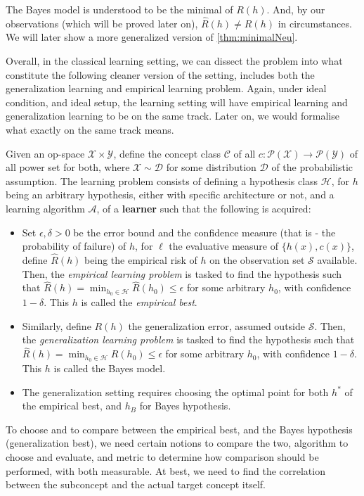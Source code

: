 The Bayes model is understood to be the minimal of $R(h)$. And, by our observations (which will be proved later on), $\hat{R}(h)\neq R(h)$ in circumstances. We will later show a more generalized version of \ref{thm:minimalNeu}. 

Overall, in the classical learning setting, we can dissect the problem into what constitute the following cleaner version of the setting, includes both the generalization learning and empirical learning problem. Again, under ideal condition, and ideal setup, the learning setting will have empirical learning and generalization learning to be on the same track. Later on, we would formalise what exactly on the same track means. 

\begin{setting}
    Given an op-space $\mathcal{X}\times\mathcal{Y}$, define the concept class $\mathcal{C}$ of all $c: \mathcal{P}(\mathcal{X})\to \mathcal{P}(\mathcal{Y})$ of all power set for both, where $\mathcal{X}\sim \mathcal{D}$ for some distribution $\mathcal{D}$ of the probabilistic assumption. The learning problem consists of defining a hypothesis class $\mathcal{H}$, for $h$ being an arbitrary hypothesis, either with specific architecture or not, and a learning algorithm $\mathcal{A}$, of a \textbf{learner} such that the following is acquired: 
    \begin{itemize}
        \item Set $\epsilon,\delta> 0$ be the error bound and the confidence measure (that is - the probability of failure) of $h$, for $\ell$ the evaluative measure of $\{h(x),c(x)\}$, define $\hat{R}(h)$ being the empirical risk of $h$ on the observation set $\mathcal{S}$ available. Then, the \textit{empirical learning problem} is tasked to find the hypothesis such that $\hat{R}(h) = \min_{h_{0}\in \mathcal{H}}\hat{R}(h_{0})\leq \epsilon$ for some arbitrary $h_{0}$, with confidence $1-\delta$. This $h$ is called the \textit{empirical best}. 
        \item Similarly, define $R(h)$ the generalization error, assumed outside $\mathcal{S}$. Then, the \textit{generalization learning problem} is tasked to find the hypothesis such that $\hat{R}(h) = \min_{h_{0}\in \mathcal{H}}R(h_{0})\leq \epsilon$ for some arbitrary $h_{0}$, with confidence $1-\delta$. This $h$ is called the Bayes model. 
        \item The generalization setting requires choosing the optimal point for both $h^{*}$ of the empirical best, and $h_{B}$ for Bayes hypothesis. 
    \end{itemize} 
\end{setting}
To choose and to compare between the empirical best, and the Bayes hypothesis (generalization best), we need certain notions to compare the two, algorithm to choose and evaluate, and metric to determine how comparison should be performed, with both measurable. At best, we need to find the correlation between the subconcept and the actual target concept itself. 

